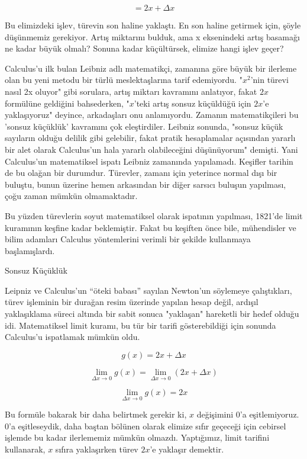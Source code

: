 \documentclass[12pt,fleqn]{article}\usepackage{../../common}
\begin{document}
$$ = 2x + \Delta x $$

Bu elimizdeki işlev, türevin son haline yaklaştı. En son haline getirmek
için, şöyle düşünmemiz gerekiyor. Artış miktarını bulduk, ama x eksenindeki
artış basamağı ne kadar büyük olmalı? Sonuna kadar küçültürsek, elimize
hangi işlev geçer?

Calculus'u ilk bulan Leibniz adlı matematikçi, zamanına göre büyük bir
ilerleme olan bu yeni metodu bir türlü meslektaşlarına tarif
edemiyordu. "$x^2$'nin türevi nasıl 2x oluyor" gibi sorulara, artış miktarı
kavramını anlatıyor, fakat $2x$ formülüne geldiğini bahsederken, "$x$'teki
artış sonsuz küçüldüğü için $2x$'e yaklaşıyoruz" deyince, arkadaşları onu
anlamıyordu. Zamanın matematikçileri bu 'sonsuz küçüklük' kavramını çok
eleştirdiler. Leibniz sonunda, "sonsuz küçük sayıların olduğu delilik gibi
gelebilir, fakat pratik hesaplamalar açısından yararlı bir alet olarak
Calculus'un hala yararlı olabileceğini düşünüyorum" demişti. Yani
Calculus'un matematiksel ispatı Leibniz zamanında yapılamadı. Keşifler
tarihin de bu olağan bir durumdur. Türevler, zamanı için yeterince normal
dışı bir buluştu, bunun üzerine hemen arkasından bir diğer sarsıcı buluşun
yapılması, çoğu zaman mümkün olmamaktadır.

Bu yüzden türevlerin soyut matematiksel olarak ispatının yapılması, 1821'de
limit kuramının keşfine kadar beklemiştir. Fakat bu keşiften önce bile,
mühendisler ve bilim adamları Calculus yöntemlerini verimli bir şekilde
kullanmaya başlamışlardı.

Sonsuz Küçüklük

Leipniz ve Calculus'un ``öteki babası'' sayılan Newton'un söylemeye
çalıştıkları, türev işleminin bir durağan resim üzerinde yapılan hesap
değil, ardışıl yaklaşıklama süreci altında bir sabit sonuca "yaklaşan"
hareketli bir hedef olduğu idi. Matematiksel limit kuramı, bu tür bir
tarifi gösterebildiği için sonunda Calculus'u ispatlamak mümkün oldu.

$$ g(x) = 2x + \Delta x $$

$$ \lim_{\Delta x \to 0}g(x) = \lim_{\Delta x \to 0} (2x + \Delta x)  $$

$$ \lim_{\Delta x \to 0}g(x) = 2x$$

Bu formüle bakarak bir daha belirtmek gerekir ki, $x$ değişimini 0'a
eşitlemiyoruz. 0'a eşitleseydik, daha baştan bölünen olarak elimize sıfır
geçeceği için cebirsel işlemde bu kadar ilerlememiz mümkün
olmazdı. Yaptığımız, limit tarifini kullanarak, $x$ sıfıra yaklaşırken
türev $2x$'e yaklaşır demektir.
\end{document}
